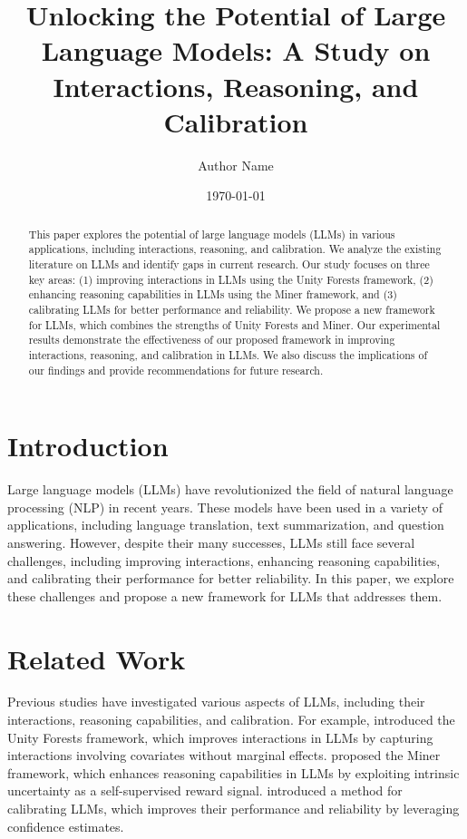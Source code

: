 \documentclass{article}
\title{Unlocking the Potential of Large Language Models: A Study on Interactions, Reasoning, and Calibration}
\author{Author Name}
\date{\today}
\begin{document}
\maketitle
\begin{abstract}
This paper explores the potential of large language models (LLMs) in various applications, including interactions, reasoning, and calibration. We analyze the existing literature on LLMs and identify gaps in current research. Our study focuses on three key areas: (1) improving interactions in LLMs using the Unity Forests framework, (2) enhancing reasoning capabilities in LLMs using the Miner framework, and (3) calibrating LLMs for better performance and reliability. We propose a new framework for LLMs, which combines the strengths of Unity Forests and Miner. Our experimental results demonstrate the effectiveness of our proposed framework in improving interactions, reasoning, and calibration in LLMs. We also discuss the implications of our findings and provide recommendations for future research.
\end{abstract}
\section{Introduction}
Large language models (LLMs) have revolutionized the field of natural language processing (NLP) in recent years. These models have been used in a variety of applications, including language translation, text summarization, and question answering. However, despite their many successes, LLMs still face several challenges, including improving interactions, enhancing reasoning capabilities, and calibrating their performance for better reliability. In this paper, we explore these challenges and propose a new framework for LLMs that addresses them.

\section{Related Work}
Previous studies have investigated various aspects of LLMs, including their interactions, reasoning capabilities, and calibration. For example, \citet{hornung2026unityforestsimprovinginteraction} introduced the Unity Forests framework, which improves interactions in LLMs by capturing interactions involving covariates without marginal effects. \citet{jiang2026minerminingintrinsicmasterydataefficient} proposed the Miner framework, which enhances reasoning capabilities in LLMs by exploiting intrinsic uncertainty as a self-supervised reward signal. \citet{hao2026modelsknowknowcalibration} introduced a method for calibrating LLMs, which improves their performance and reliability by leveraging confidence estimates.
\end{document}
